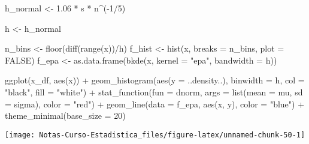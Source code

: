 \documentclass[
  12pt,
]{book}
\newenvironment{Shaded}{\begin{snugshade}}{\end{snugshade}}
\newcommand{\AttributeTok}[1]{\textcolor[rgb]{0.77,0.63,0.00}{#1}}
\newcommand{\ConstantTok}[1]{\textcolor[rgb]{0.00,0.00,0.00}{#1}}
\newcommand{\DecValTok}[1]{\textcolor[rgb]{0.00,0.00,0.81}{#1}}
\newcommand{\FloatTok}[1]{\textcolor[rgb]{0.00,0.00,0.81}{#1}}
\newcommand{\FunctionTok}[1]{\textcolor[rgb]{0.00,0.00,0.00}{#1}}
\newcommand{\NormalTok}[1]{#1}
\newcommand{\OtherTok}[1]{\textcolor[rgb]{0.56,0.35,0.01}{#1}}
\newcommand{\SpecialCharTok}[1]{\textcolor[rgb]{0.00,0.00,0.00}{#1}}
\newcommand{\StringTok}[1]{\textcolor[rgb]{0.31,0.60,0.02}{#1}}
\theoremstyle{definition}
\theoremstyle{definition}
\theoremstyle{definition}
\theoremstyle{definition}
\theoremstyle{remark}
\begin{document}
\begin{Shaded}
\begin{Highlighting}[]
\NormalTok{h\_normal }\OtherTok{\textless{}{-}} \FloatTok{1.06} \SpecialCharTok{*}\NormalTok{ s }\SpecialCharTok{*}\NormalTok{ n}\SpecialCharTok{\^{}}\NormalTok{(}\SpecialCharTok{{-}}\DecValTok{1}\SpecialCharTok{/}\DecValTok{5}\NormalTok{)}

\NormalTok{h }\OtherTok{\textless{}{-}}\NormalTok{ h\_normal}

\NormalTok{n\_bins }\OtherTok{\textless{}{-}} \FunctionTok{floor}\NormalTok{(}\FunctionTok{diff}\NormalTok{(}\FunctionTok{range}\NormalTok{(x))}\SpecialCharTok{/}\NormalTok{h)}
\NormalTok{f\_hist }\OtherTok{\textless{}{-}} \FunctionTok{hist}\NormalTok{(x, }\AttributeTok{breaks =}\NormalTok{ n\_bins, }\AttributeTok{plot =} \ConstantTok{FALSE}\NormalTok{)}
\NormalTok{f\_epa }\OtherTok{\textless{}{-}} \FunctionTok{as.data.frame}\NormalTok{(}\FunctionTok{bkde}\NormalTok{(x, }\AttributeTok{kernel =} \StringTok{"epa"}\NormalTok{, }\AttributeTok{bandwidth =}\NormalTok{ h))}

\FunctionTok{ggplot}\NormalTok{(x\_df, }\FunctionTok{aes}\NormalTok{(x)) }\SpecialCharTok{+} \FunctionTok{geom\_histogram}\NormalTok{(}\FunctionTok{aes}\NormalTok{(}\AttributeTok{y =}\NormalTok{ ..density..),}
    \AttributeTok{binwidth =}\NormalTok{ h, }\AttributeTok{col =} \StringTok{"black"}\NormalTok{, }\AttributeTok{fill =} \StringTok{"white"}\NormalTok{) }\SpecialCharTok{+}
    \FunctionTok{stat\_function}\NormalTok{(}\AttributeTok{fun =}\NormalTok{ dnorm, }\AttributeTok{args =} \FunctionTok{list}\NormalTok{(}\AttributeTok{mean =}\NormalTok{ mu,}
        \AttributeTok{sd =}\NormalTok{ sigma), }\AttributeTok{color =} \StringTok{"red"}\NormalTok{) }\SpecialCharTok{+} \FunctionTok{geom\_line}\NormalTok{(}\AttributeTok{data =}\NormalTok{ f\_epa,}
    \FunctionTok{aes}\NormalTok{(x, y), }\AttributeTok{color =} \StringTok{"blue"}\NormalTok{) }\SpecialCharTok{+} \FunctionTok{theme\_minimal}\NormalTok{(}\AttributeTok{base\_size =} \DecValTok{20}\NormalTok{)}
\end{Highlighting}
\end{Shaded}

\begin{center}\texttt{[image: Notas-Curso-Estadistica\_files/figure-latex/unnamed-chunk-50-1]} \end{center}
\end{document}
